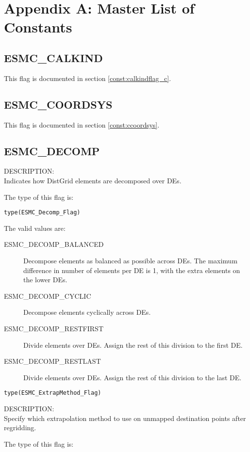 
\section{Appendix A: Master List of Constants}
\label{const:cmaster}

\subsection{ESMC\_CALKIND}
This flag is documented in section \ref{const:calkindflag_c}.

\subsection{ESMC\_COORDSYS}
This flag is documented in section \ref{const:ccoordsys}.

\subsection{ESMC\_DECOMP}
\label{const:cdecompflag}
{\sf DESCRIPTION:\\}
Indicates how DistGrid elements are decomposed over DEs.

The type of this flag is:

{\tt type(ESMC\_Decomp\_Flag)}

The valid values are:
\begin{description}
\item [ESMC\_DECOMP\_BALANCED]
      Decompose elements as balanced as possible across DEs. The maximum 
      difference in number of elements per DE is 1, with the extra elements on
      the lower DEs.
\item [ESMC\_DECOMP\_CYCLIC]
      Decompose elements cyclically across DEs.
\item [ESMC\_DECOMP\_RESTFIRST]
      Divide elements over DEs. Assign the rest of this division to the first
      DE.
\item [ESMC\_DECOMP\_RESTLAST]
      Divide elements over DEs. Assign the rest of this division to the last DE.
\end{description}

{\tt type(ESMC\_ExtrapMethod\_Flag)}
\label{opt:cextrapmethod}

{\sf DESCRIPTION:\\}
Specify which extrapolation method to use on unmapped destination points after 
regridding.

The type of this flag is:

